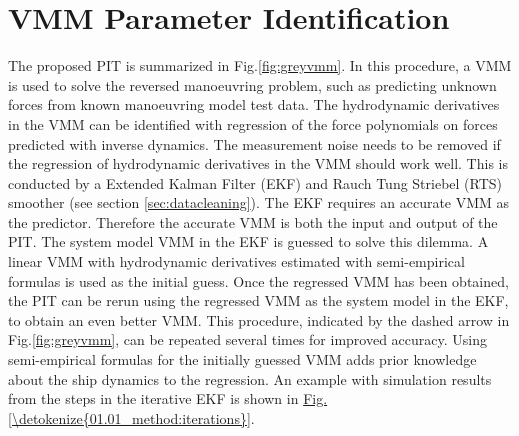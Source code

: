 \section{VMM Parameter Identification} \label{sec:PIT_VMM}
The proposed PIT is summarized in Fig.\ref{fig:greyvmm}. In this procedure, a VMM is used to solve the reversed manoeuvring problem, such as predicting unknown forces from known manoeuvring model test data. The hydrodynamic derivatives in the VMM can be identified with regression of the force polynomials on forces predicted with inverse dynamics.
The measurement noise needs to be removed if the regression of hydrodynamic derivatives in the VMM should work well. This is conducted by a Extended Kalman Filter (EKF) and Rauch Tung Striebel (RTS) smoother (see section \ref{sec:datacleaning}). The EKF requires an accurate VMM as the predictor.
Therefore the accurate VMM is both the input and output of the PIT. The system model VMM in the EKF is guessed to solve this dilemma. A linear VMM with hydrodynamic derivatives estimated with semi-empirical formulas is used as the initial guess. Once the regressed VMM has been obtained, the PIT can be rerun using the regressed VMM as the system model in the EKF, to obtain an even better VMM. This procedure, indicated by the dashed arrow in Fig.\ref{fig:greyvmm}, can be repeated several times for improved accuracy. Using semi-empirical formulas for the initially guessed VMM adds prior knowledge about the ship dynamics to the regression. An example with simulation results from the steps in the iterative EKF is shown in \hyperref[\detokenize{01.01_method:iterations}]{Fig.\@\ref{\detokenize{01.01_method:iterations}}}.

